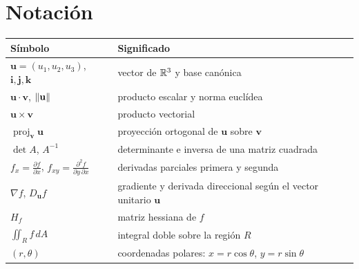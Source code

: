 \documentclass[11pt,a4paper,twoside,openany]{book}
\newcommand{\vu}{\mathbf{u}}
\newcommand{\vv}{\mathbf{v}}
\newcommand{\vi}{\mathbf{i}}
\newcommand{\vj}{\mathbf{j}}
\newcommand{\vk}{\mathbf{k}}
\newcommand{\proj}{\operatorname{proj}}
\newcommand{\dA}{\,dA}
\newcommand{\pd}[2]{\frac{\partial #1}{\partial #2}}
\begin{document}
\section*{Notación}
\begin{center}
\begin{tabular}{@{}ll@{}}
\toprule
Símbolo & Significado \\
\midrule
$\vu=(u_1,u_2,u_3)$, $\vi,\vj,\vk$ & vector de $\mathbb{R}^3$ y base canónica \\
$\vu\cdot\vv$, $\norm{\vu}$ & producto escalar y norma euclídea \\
$\vu\times\vv$ & producto vectorial \\
$\proj_{\vv}\vu$ & proyección ortogonal de $\vu$ sobre $\vv$ \\
$\det A$, $A^{-1}$ & determinante e inversa de una matriz cuadrada \\
$f_x=\pd fx$, $f_{xy}=\frac{\partial^2 f}{\partial y\,\partial x}$ & derivadas parciales primera y segunda \\
$\nabla f$, $D_{\vu}f$ & gradiente y derivada direccional según el vector unitario $\vu$ \\
$H_f$ & matriz hessiana de $f$ \\
$\iint_R f\dA$ & integral doble sobre la región $R$ \\
$(r,\theta)$ & coordenadas polares: $x=r\cos\theta$, $y=r\sin\theta$ \\
\bottomrule
\end{tabular}
\end{center}


\tableofcontents

\mainmatter







\backmatter

\end{document}

